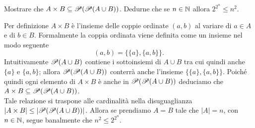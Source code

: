 \begin{es}
  Mostrare che $ A \times B \subseteq \P(\P(A \cup B)) $. Dedurne che se $ n \in \N $ allora $ 2^{2^n} \leq n^2 $.
\end{es}
Per definizione $ A \times B $ è l'insieme delle coppie ordinate $ (a, b) $ al variare di $ a \in A $ e di $ b \in B $. Formalmente la coppia ordinata viene definita come un insieme nel modo seguente \[(a,b) = \{\{a\}, \{a, b\}\}.\] \textsf{Intuitivamente $ \P(A \cup B) $ contiene i sottoinsiemi di $ A \cup B $ tra cui quindi anche $ \{a\} $ e $ \{a,b\} $; allora $ \P(\P(A \cup B)) $ conterrà anche l'insieme $ \{\{a\}, \{a, b\}\} $. Poiché quindi ogni elemento di $ A \times B $ è anche in $ \P(\P(A \cup B)) $ deduciamo che $ A \times B \subseteq \P(\P(A \cup B)) $.}\\
Tale relazione si traspone alle cardinalità nella disuguaglianza $ |A \times B| \leq |\P(\P(A \cup B))| $. Allora se prendiamo $ A = B $ tale che $ |A| = n $, con $ n \in \N $, segue banalmente che $ n^2 \leq 2^{2^n} $.


